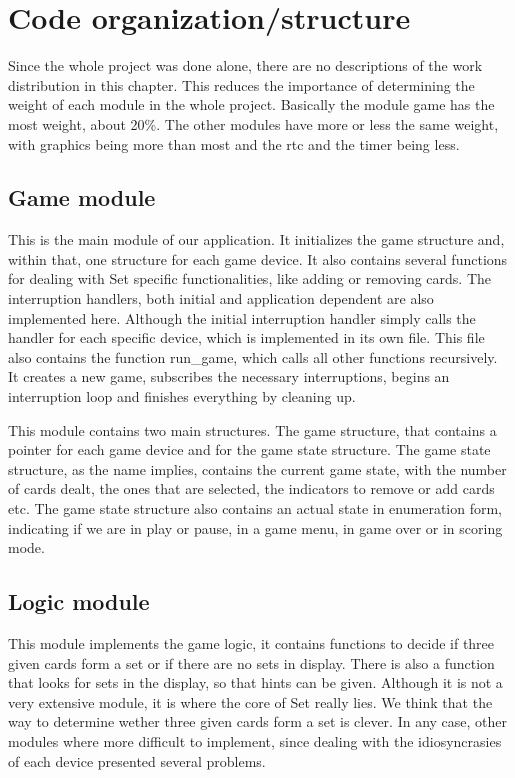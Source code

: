 \documentclass[11pt,a4paper,reqno]{report}
\numberwithin{equation}{section}
\begin{document}
\chapter{Code organization/structure}

Since the whole project was done alone, there are no descriptions of the work distribution in this chapter. This reduces the importance of determining the weight of each module in the whole project. Basically the module game has the most weight, about 20\%. The other modules have more or less the same weight, with graphics being more than most and the rtc and the timer being less.

\section{Game module}

This is the main module of our application. It initializes the game structure and, within that, one structure for each game device. It also contains several functions for dealing with Set specific functionalities, like adding or removing cards. The interruption handlers, both initial and application dependent are also implemented here. Although the initial interruption handler simply calls the handler for each specific device, which is implemented in its own file. This file also contains the function run\_game, which calls all other functions recursively. It creates a new game, subscribes the necessary interruptions, begins an interruption loop and finishes everything by cleaning up.

This module contains two main structures. The game structure, that contains a pointer for each game device and for the game state structure. The game state structure, as the name implies, contains the current game state, with the number of cards dealt, the ones that are selected, the indicators to remove or add cards etc. The game state structure also contains an actual state in enumeration form, indicating if we are in play or pause, in a game menu, in game over or in scoring mode. 

\section{Logic module}

This module implements the game logic, it contains functions to decide if three given cards form a set or if there are no sets in display. There is also a function that looks for sets in the display, so that hints can be given. Although it is not a very extensive module, it is where the core of Set really lies. We think that the way to determine wether three given cards form a set is clever. In any case, other modules where more difficult to implement, since dealing with the idiosyncrasies of each device presented several problems.
\end{document}
